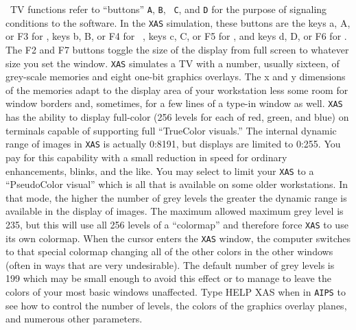      \AIPS\ TV functions refer to ``buttons'' {\tt A}, {\tt B}, {\tt
C}, and {\tt D} for the purpose of signaling conditions to the
software.  In the {\tt XAS} simulation, these buttons are the keys a,
A, or F3 for {\tt {}}, keys b, B, or F4 for {\tt
{}}, keys c, C, or F5 for {\tt {}}, and keys
d, D, or F6 for {\tt {}}\@.  The F2 and F7 buttons toggle
the size of the display from full screen to whatever size you set the
window. {\tt XAS} simulates a TV with a number, usually sixteen, of
grey-scale memories and eight one-bit graphics overlays.  The x and y
dimensions of the memories adapt to the display area of your
workstation less some room for window borders and, sometimes, for a
few lines of a type-in window as well.  {\tt XAS} has the ability to
display full-color (256 levels for each of red, green, and blue) on
terminals capable of supporting full ``TrueColor visuals.''  The
internal dynamic range of images in {\tt XAS} is actually 0:8191,
but displays are limited to 0:255.  You pay for this capability with a
small reduction in speed for ordinary enhancements, blinks, and the
like.  You may select to limit your {\tt XAS} to a ``PseudoColor
visual'' which is all that is available on some older workstations.
In that mode, the higher the number of grey levels the greater the
dynamic range is available in the display of images.  The maximum
allowed maximum grey level is 235, but this will use all 256 levels of
a ``colormap'' and therefore force {\tt XAS} to use its own colormap.
When the cursor enters the {\tt XAS} window, the computer switches to
that special colormap changing all of the other colors in the other
windows (often in ways that are very undesirable).  The default number
of grey levels is 199 which may be small enough to avoid this effect
or to manage to leave the colors of your most basic windows
unaffected.  Type {\us HELP XAS \CR} when in {\tt AIPS} to see how to
control the number of levels, the colors of the graphics overlay
planes, and numerous other parameters.



\bre
{}
\ere


\bre
{}
\ere
\eject
